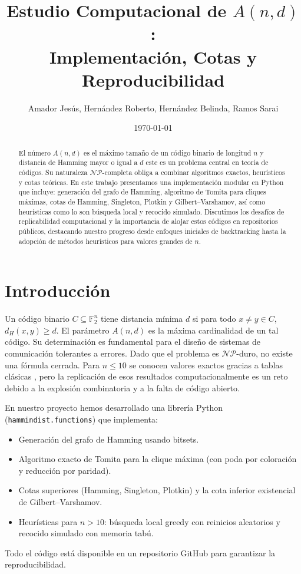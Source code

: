 \documentclass[12pt, spanish]{article}
\title{Estudio Computacional de $A(n,d)$: \\ Implementación, Cotas y Reproducibilidad}
\author{Amador Jesús, Hernández Roberto, Hernández Belinda, Ramos Sarai}
\date{\today}
\begin{document}
\maketitle

\begin{abstract}
El número $A(n,d)$ es el máximo tamaño de un código binario de longitud $n$ y distancia de Hamming mayor o igual a $d$ este es un problema central en teoría de códigos. Su naturaleza $\mathcal{NP}$-completa obliga a combinar algoritmos exactos, heurísticos y cotas teóricas. En este trabajo presentamos una implementación modular en Python que incluye: generación del grafo de Hamming, algoritmo de Tomita para cliques máximas, cotas de Hamming, Singleton, Plotkin y Gilbert–Varshamov, así como heurísticas como lo son búsqueda local y recocido simulado. Discutimos los desafíos de replicabilidad computacional y la importancia de alojar estos códigos en repositorios públicos, destacando nuestro progreso desde enfoques iniciales de backtracking hasta la adopción de métodos heurísticos para valores grandes de $n$.
\end{abstract}

\section{Introducción}
Un código binario $C\subseteq\mathbb{F}_2^n$ tiene distancia mínima $d$ si para todo $x\neq y\in C$, $d_H(x,y)\ge d$. El parámetro $A(n,d)$ es la máxima cardinalidad de un tal código. Su determinación es fundamental para el diseño de sistemas de comunicación tolerantes a errores. Dado que el problema es $\mathcal{NP}$-duro, no existe una fórmula cerrada. Para $n\le 10$ se conocen valores exactos gracias a tablas clásicas \cite{best1978,agrell2001,brouwer2018}, pero la replicación de esos resultados computacionalmente es un reto debido a la explosión combinatoria y a la falta de código abierto.

En nuestro proyecto hemos desarrollado una librería Python (\texttt{hammindist.functions}) que implementa:
\begin{itemize}
\item Generación del grafo de Hamming usando bitsets.
\item Algoritmo exacto de Tomita para la clique máxima (con poda por coloración y reducción por paridad).
\item Cotas superiores (Hamming, Singleton, Plotkin) y la cota inferior existencial de Gilbert–Varshamov.
\item Heurísticas para $n>10$: búsqueda local greedy con reinicios aleatorios y recocido simulado con memoria tabú.
\end{itemize}
Todo el código está disponible en un repositorio GitHub para garantizar la reproducibilidad.
\end{document}
